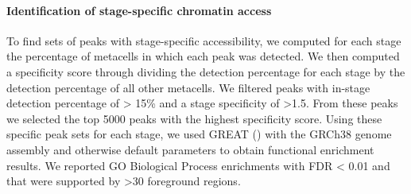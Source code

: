 \paragraph{Identification of stage-specific chromatin access}
To find sets of peaks with stage-specific accessibility, we computed for each stage the percentage of metacells in which each peak was detected. We then computed a specificity score through dividing the detection percentage for each stage by the detection percentage of all other metacells. We filtered peaks with in-stage detection percentage of > 15\% and a stage specificity of >1.5. From these peaks we selected the top 5000 peaks with the highest specificity score. Using these specific peak sets for each stage, we used GREAT (\cite{mclean_great_2010}) with the GRCh38 genome assembly and otherwise default parameters to obtain functional enrichment results. We reported GO Biological Process enrichments with FDR < 0.01 and that were supported by >30 foreground regions.
 
 
